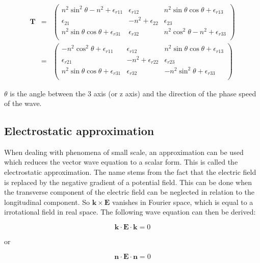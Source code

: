 \documentclass[a4paper,11pt]{thesis}
\begin{document}
\begin{eqnarray}\label{eq:radiation_tensor}
    \mathbf{T}
&=&
\left(%
\begin{array}{ccc}
   n^2 \sin^2 \theta -n^2 +\epsilon_{r11} &  \epsilon_{r12} & n^2 \sin \theta \cos \theta +\epsilon_{r13}\\
\epsilon_{21}&  -n^2+\epsilon_{22} & \epsilon_{23}\\
 n^2 \sin \theta \cos \theta +\epsilon_{r31} & \epsilon_{r32} &  n^2 \cos^2 \theta -n^2+\epsilon_{r33} \\
\end{array}%
\right)\nonumber\\
&=&
\left(%
\begin{array}{ccc}
   -n^2 \cos^2 \theta +\epsilon_{r11} &  \epsilon_{r12} & n^2 \sin \theta \cos \theta +\epsilon_{r13}\\
\epsilon_{r21}&  -n^2+\epsilon_{r22} & \epsilon_{r23}\\
 n^2 \sin \theta \cos \theta +\epsilon_{r31} & \epsilon_{r32} &  - n^2 \sin^2 \theta +\epsilon_{r33} \\
\end{array}%
\right)
\end{eqnarray}

$\theta$ is the angle between the 3 axis (or z axis) and the direction of the phase speed of the wave.

\subsection{Electrostatic approximation}
When dealing with phenomena of small scale, an approximation can be used which reduces the vector wave equation to a scalar form. This is called the electrostatic approximation. The name stems from the fact that the electric field is replaced by the negative gradient of a potential field. This can be done when the transverse component of the electric field can be neglected in relation to the longitudinal component. So $\mathbf{k}\times \mathbf{E}$ vanishes in Fourier space, which is equal to a irrotational field in real space. The following wave equation can then be derived:

\begin{equation}
    \mathbf{k}\cdot \mathbf{E} \cdot \mathbf{k} =0
\end{equation}

or

\begin{equation}
    \mathbf{n}\cdot \mathbf{E} \cdot \mathbf{n} =0
\end{equation}
\end{document}
